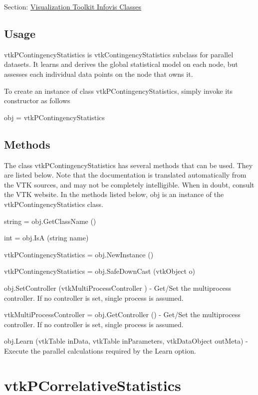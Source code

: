 Section\-: \hyperlink{sec_vtkinfovis}{Visualization Toolkit Infovis Classes} \hypertarget{vtkwidgets_vtkxyplotwidget_Usage}{}\subsection{Usage}\label{vtkwidgets_vtkxyplotwidget_Usage}
vtk\-P\-Contingency\-Statistics is vtk\-Contingency\-Statistics subclass for parallel datasets. It learns and derives the global statistical model on each node, but assesses each individual data points on the node that owns it.

To create an instance of class vtk\-P\-Contingency\-Statistics, simply invoke its constructor as follows \begin{DoxyVerb}  obj = vtkPContingencyStatistics
\end{DoxyVerb}
 \hypertarget{vtkwidgets_vtkxyplotwidget_Methods}{}\subsection{Methods}\label{vtkwidgets_vtkxyplotwidget_Methods}
The class vtk\-P\-Contingency\-Statistics has several methods that can be used. They are listed below. Note that the documentation is translated automatically from the V\-T\-K sources, and may not be completely intelligible. When in doubt, consult the V\-T\-K website. In the methods listed below, {\ttfamily obj} is an instance of the vtk\-P\-Contingency\-Statistics class. 
\begin{DoxyItemize}
\item {\ttfamily string = obj.\-Get\-Class\-Name ()}  
\item {\ttfamily int = obj.\-Is\-A (string name)}  
\item {\ttfamily vtk\-P\-Contingency\-Statistics = obj.\-New\-Instance ()}  
\item {\ttfamily vtk\-P\-Contingency\-Statistics = obj.\-Safe\-Down\-Cast (vtk\-Object o)}  
\item {\ttfamily obj.\-Set\-Controller (vtk\-Multi\-Process\-Controller )} -\/ Get/\-Set the multiprocess controller. If no controller is set, single process is assumed.  
\item {\ttfamily vtk\-Multi\-Process\-Controller = obj.\-Get\-Controller ()} -\/ Get/\-Set the multiprocess controller. If no controller is set, single process is assumed.  
\item {\ttfamily obj.\-Learn (vtk\-Table in\-Data, vtk\-Table in\-Parameters, vtk\-Data\-Object out\-Meta)} -\/ Execute the parallel calculations required by the Learn option.  
\end{DoxyItemize}\hypertarget{vtkinfovis_vtkpcorrelativestatistics}{}\section{vtk\-P\-Correlative\-Statistics}\label{vtkinfovis_vtkpcorrelativestatistics}
